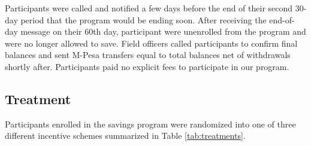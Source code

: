 \documentclass[11pt]{article}
\begin{document}
		Participants were called and notified a few days before the end of their second 30-day period that the program would be ending soon. After receiving the end-of-day message on their 60th day, participant were unenrolled from the program and were no longer allowed to save. Field officers called participants to confirm final balances and sent M-Pesa transfers equal to total balances net of withdrawals shortly after. Participants paid no explicit fees to participate in our program.

	\subsection{Treatment} \label{sec:treat}

		Participants enrolled in the savings program were randomized into one of three different incentive schemes summarized in Table \ref{tab:treatments}.
\end{document}
